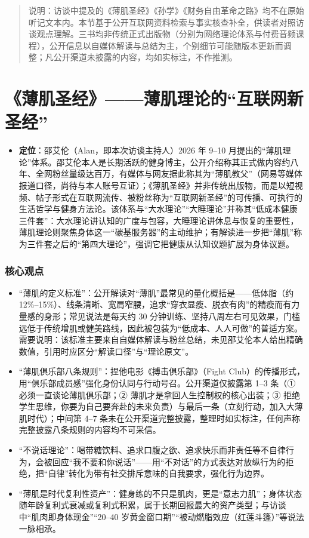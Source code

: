 \begin{quote}
说明：访谈中提及的《薄肌圣经》《孙学》《财务自由革命之路》均不在原始听记文本内。本节基于公开互联网资料检索与事实核查补全，供读者对照访谈观点理解。三书均非传统正式出版物（分别为网络理论体系与付费音频课程），公开信息以自媒体解读与总结为主，个别细节可能随版本更新而调整；凡公开渠道未披露的内容，均如实标注，不作推测。
\end{quote}

\section{《薄肌圣经》------薄肌理论的``互联网新圣经''}

\begin{itemize}
\tightlist
\item
  \textbf{定位}：邵艾伦（Alan，即本次访谈主持人）2026 年 9--10
  月提出的``薄肌理论''体系。邵艾伦本人是长期活跃的健身博主，公开介绍称其正式做内容约八年、全网粉丝量级达百万，有媒体与网友据此称其为``薄肌教父''（网易等媒体报道口径，尚待与本人账号互证）；《薄肌圣经》并非传统出版物，而是以短视频、帖子形式在互联网流传、被粉丝称为``互联网新圣经''的可传播、可执行的生活哲学与健身方法论。该体系与``大水理论''``大睡理论''并称其``低成本健康三件套''：大水理论讲认知的广度与包容，大睡理论讲休息与恢复的重要性，薄肌理论则聚焦身体这一``碳基服务器''的主动维护；有解读进一步把``薄肌''称为三件套之后的``第四大理论''，强调它把健康从认知议题扩展为身体议题。
\end{itemize}

\subsubsection*{核心观点}

\begin{itemize}
\item
  ``薄肌的定义标准''：公开解读对``薄肌''最常见的量化概括是------低体脂（约
  12\%--15\%）、线条清晰、宽肩窄腰，追求``穿衣显瘦、脱衣有肉''的精瘦而有力量感的身形；常见说法是每天约
  30
  分钟训练、坚持八周左右可见效果，门槛远低于传统增肌或健美路线，因此被包装为``低成本、人人可做''的普适方案。需要说明：该标准主要来自自媒体解读与粉丝总结，未见邵艾伦本人给出精确数值，引用时应区分``解读口径''与``理论原文''。
\item
  ``薄肌俱乐部八条规则''：捏他电影《搏击俱乐部》（Fight
  Club）的传播形式，用``俱乐部成员感''强化身份认同与行动号召。公开渠道仅披露第
  1--3 条（① 必须一直谈论薄肌俱乐部；②
  薄肌才是拿回人生控制权的核心出装；③
  拒绝学生思维，你要为自己要奔赴的未来负责）与最后一条（立刻行动，加入大薄肌时代）；中间第
  4--7
  条未在公开渠道完整披露，整理时如实标注，任何声称完整披露八条规则的内容均不可采信。
\item
  ``不说话理论''：喝带糖饮料、追求口腹之欲、追求快乐而非责任等不自律行为，会被回应``我不要和你说话''------用``不对话''的方式表达对放纵行为的拒绝，把``自律''转化为带有社交排斥意味的自我要求，强化行为边界。
\item
  ``薄肌是时代复利性资产''：健身练的不只是肌肉，更是``意志力肌''；身体状态随年龄复利式衰减或复利式积累，属于长期回报最大的资产类型；与访谈中``肌肉即身体现金''``20--40
  岁黄金窗口期''``被动燃脂效应（红莲斗篷）''等说法一脉相承。
\end{itemize}

